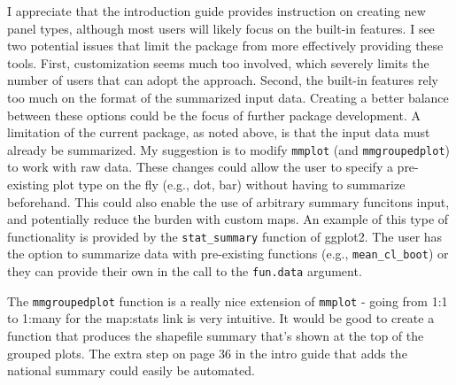 \documentclass[letterpaper,12pt]{article}\usepackage[]{graphicx}\usepackage[]{color}
\begin{document}
I appreciate that the introduction guide provides instruction on creating new panel types, although most users will likely focus on the built-in features.  I see two potential issues that limit the package from more effectively providing these tools.  First, customization seems much too involved, which severely limits the number of users that can adopt the approach.  Second, the built-in features rely too much on the format of the summarized input data.  Creating a better balance between these options could be the focus of further package development.  A limitation of the current package, as noted above, is that the input data must already be summarized.  My suggestion is to modify \texttt{mmplot} (and \texttt{mmgroupedplot}) to work with raw data.  These changes could allow the user to specify a pre-existing plot type on the fly (e.g., dot, bar) without having to summarize beforehand.  This could also enable the use of arbitrary summary funcitons input, and potentially reduce the burden with custom maps.  An example of this type of functionality is provided by the \texttt{stat\_summary} function of ggplot2.  The user has the option to summarize data with pre-existing functions (e.g., \texttt{mean\_cl\_boot}) or they can provide their own in the call to the \texttt{fun.data} argument.

The \texttt{mmgroupedplot} function is a really nice extension of \texttt{mmplot} - going from 1:1 to 1:many for the map:stats link is very intuitive.  It would be good to create a function that produces the shapefile summary that's shown at the top of the grouped plots.  The extra step on page 36 in the intro guide that adds the national summary could easily be automated.
\end{document}

